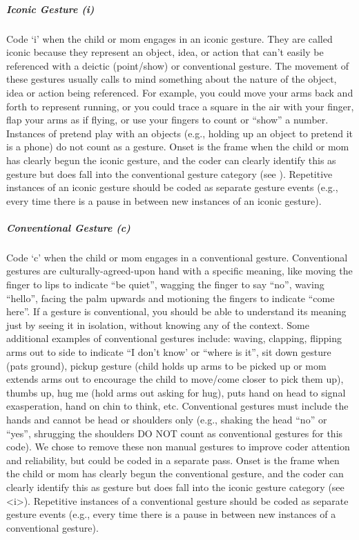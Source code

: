 \documentclass[
  12pt,
]{book}
\begin{document}
\hypertarget{iconic_gesture}{%
\subparagraph*{Iconic Gesture (i)}\label{iconic_gesture}}

Code `i' when the child or mom engages in an iconic gesture. They are called iconic because they represent an object, idea, or action that can't easily be referenced with a deictic (point/show) or conventional gesture. The movement of these gestures usually calls to mind something about the nature of the object, idea or action being referenced. For example, you could move your arms back and forth to represent running, or you could trace a square in the air with your finger, flap your arms as if flying, or use your fingers to count or ``show'' a number. Instances of pretend play with an objects (e.g., holding up an object to pretend it is a phone) do not count as a gesture.
Onset is the frame when the child or mom has clearly begun the iconic gesture, and the coder can clearly identify this as gesture but does fall into the conventional gesture category (see ). Repetitive instances of an iconic gesture should be coded as separate gesture events (e.g., every time there is a pause in between new instances of an iconic gesture).

\hypertarget{conventional_gesture}{%
\subparagraph*{Conventional Gesture (c)}\label{conventional_gesture}}

Code `c' when the child or mom engages in a conventional gesture. Conventional gestures are culturally-agreed-upon hand with a specific meaning, like moving the finger to lips to indicate ``be quiet'', wagging the finger to say ``no'', waving ``hello'', facing the palm upwards and motioning the fingers to indicate ``come here''.
If a gesture is conventional, you should be able to understand its meaning just by seeing it in isolation, without knowing any of the context. Some additional examples of conventional gestures include: waving, clapping, flipping arms out to side to indicate ``I don't know' or ``where is it'', sit down gesture (pats ground), pickup gesture (child holds up arms to be picked up or mom extends arms out to encourage the child to move/come closer to pick them up), thumbs up, hug me (hold arms out asking for hug), puts hand on head to signal exasperation, hand on chin to think, etc.
Conventional gestures must include the hands and cannot be head or shoulders only (e.g., shaking the head ``no'' or ``yes'', shrugging the shoulders DO NOT count as conventional gestures for this code). We chose to remove these non manual gestures to improve coder attention and reliability, but could be coded in a separate pass.
Onset is the frame when the child or mom has clearly begun the conventional gesture, and the coder can clearly identify this as gesture but does fall into the iconic gesture category (see \textless i\textgreater). Repetitive instances of a conventional gesture should be coded as separate gesture events (e.g., every time there is a pause in between new instances of a conventional gesture).
\end{document}
